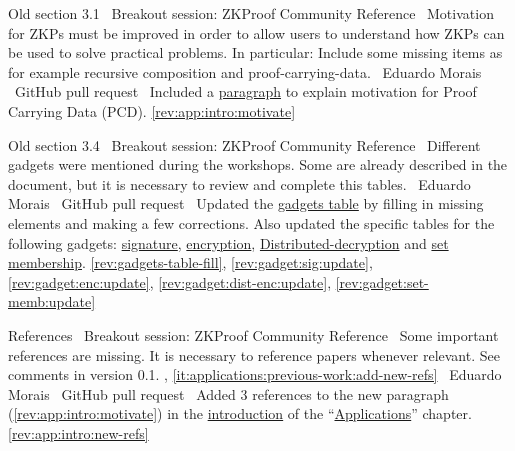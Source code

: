 Old section 3.1
\newcol \ccontext\ Breakout session: ZKProof Community Reference
				\propContrib\ Motivation for ZKPs must be improved in order to allow users to understand how ZKPs can be used to solve practical problems. In particular: Include some missing items as for example recursive composition and proof-carrying-data.
\newcol {}
\newcol \contributors\ Eduardo Morais
				\submit\ GitHub pull request
				\Chan\ Included a \hyperref[par:apps:intro:functionality-vs-performance]{paragraph} to explain motivation for Proof Carrying Data (PCD).	
\newcol \ref{rev:app:intro:motivate}
\rowendL
\myendIssue



Old section 3.4
\newcol \ccontext\ Breakout session: ZKProof Community Reference
				\propContrib\ Different gadgets were mentioned during the workshops. Some are already described in the document, but it is necessary to review and complete this tables.
\newcol {}
\newcol \contributors\ Eduardo Morais
				\submit\ GitHub pull request
				\Chan\ Updated the \hyperref[tab:list-gadgets]{gadgets table} by filling in missing elements and making a few corrections.
				Also updated the specific tables for the following gadgets: \hyperref[tab:gadget-signature]{signature}, \hyperref[tab:gadget-encryption]{encryption}, \hyperref[tab:gadget-dist-decryption]{Distributed-decryption} and \hyperref[tab:gadget-set-membership]{set membership}.
\newcol \ref{rev:gadgets-table-fill}, \ref{rev:gadget:sig:update}, \ref{rev:gadget:enc:update}, \ref{rev:gadget:dist-enc:update}, \ref{rev:gadget:set-memb:update}
\rowendL
\myendIssue


References
\newcol \ccontext\ Breakout session: ZKProof Community Reference
				\propContrib\ Some important references are missing. It is necessary to reference papers whenever relevant. See comments in version 0.1.
\newcol {}, \ref{it:applications:previous-work:add-new-refs}
\newcol \contributors\ Eduardo Morais
				\submit\ GitHub pull request
				\Chan\ Added 3 references to the new paragraph (\ref{rev:app:intro:motivate}) in the \hyperref[apps:intro]{introduction} of the ``\hyperref[chap:apps]{Applications}'' chapter.
\newcol \ref{rev:app:intro:new-refs}
\rowendL
\myendIssue



